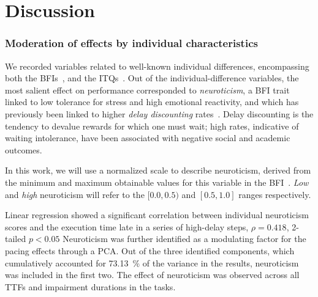 \section{Discussion}

\subsubsection{Moderation of effects by individual characteristics}\label{ssec:moderationeffects}



We recorded variables related to well-known individual differences, encompassing both the \glspl{BFI}~\cite{john1999big}, and the \glspl{ITQ}~\cite{witmer1998measuring}.
Out of the individual-difference variables, the most salient effect on performance corresponded to \emph{neuroticism}, a \gls{BFI} trait linked to low tolerance for stress and high emotional reactivity, and which has previously been linked to higher \emph{delay discounting} rates~\cite{hirsh2008delay}.
Delay discounting is the tendency to devalue rewards for which one must wait; high rates, indicative of waiting intolerance, have been associated with negative social and academic outcomes.


In this work, we will use a normalized scale to describe neuroticism, derived from the minimum and maximum obtainable values for this variable in the \gls{BFI}~\cite{john1999big}.
\emph{Low} and \emph{high} neuroticism will refer to the \( [0.0, 0.5) \) and \( [0.5, 1.0] \) ranges respectively.

Linear regression showed a significant correlation between individual neuroticism scores and the execution time late in a series of high-delay steps, \( \rho = 0.418 \), \num{2}-tailed \( p < 0.05 \)
Neuroticism was further identified as a modulating factor for the pacing effects through a \gls{PCA}.
Out of the three identified components, which cumulatively accounted for \SI{73.13}{\percent} of the variance in the results, neuroticism was included in the first two.
The effect of neuroticism was observed across all \glspl{TTF} and impairment durations in the tasks.


